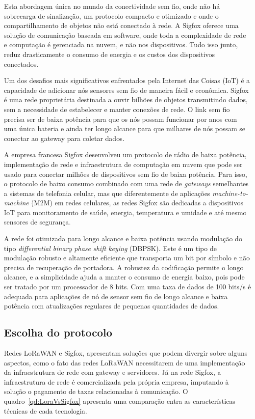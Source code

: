 Esta abordagem única no mundo da conectividade sem fio, onde não há sobrecarga de sinalização, um protocolo compacto e otimizado e onde o compartilhamento de objetos não está conectado à rede.
A Sigfox oferece uma solução de comunicação baseada em software, onde toda a complexidade de rede e computação é gerenciada na nuvem, e não nos dispositivos. Tudo isso junto, reduz drasticamente o consumo de energia e os custos dos dispositivos conectados.


Um dos desafios mais significativos enfrentados pela Internet das Coisas (IoT) é a capacidade de adicionar nós sensores sem fio de maneira fácil e econômica. Sigfox é uma rede proprietária destinada a ouvir bilhões de objetos transmitindo dados, sem a necessidade de estabelecer e manter conexões de rede. O link sem fio precisa ser de baixa potência para que os nós possam funcionar por anos com uma única bateria e ainda ter longo alcance para que milhares de nós possam se conectar ao gateway para coletar dados.

A empresa francesa Sigfox desenvolveu um protocolo de rádio de baixa potência, implementação de rede e infraestrutura de computação em nuvem que pode ser usado para conectar milhões de dispositivos sem fio de baixa potência. Para isso, o protocolo de baixo consumo combinado com uma rede de \textit{gateways} semelhantes a sistemas de telefonia celular, mas que diferentemente de aplicações \textit{machine-to-machine} (M2M) em redes celulares, as redes Sigfox são dedicadas a dispositivos IoT para monitoramento de saúde, energia, temperatura e umidade e até mesmo sensores de segurança.

A rede foi otimizada para longo alcance e baixa potência usando modulação do tipo \textit{differential binary phase shift keying} (DBPSK). Este é um tipo de modulação robusto e altamente eficiente que transporta um bit por símbolo e não precisa de recuperação de portadora. A robustez da codificação permite o longo alcance, e a simplicidade ajuda a manter o consumo de energia baixo, pois pode ser tratado por um processador de 8 bits. Com uma taxa de dados de 100 bits/s é adequada para aplicações de nó de sensor sem fio de longo alcance e baixa potência com atualizações regulares de pequenas quantidades de dados.


\subsection{Escolha do protocolo}
Redes LoRaWAN e Sigfox, apresentam soluções que podem divergir sobre alguns aspectos, como o fato das redes LoRaWAN necessitarem de uma implementação da infraestrutura de rede com gateway e servidores. Já na rede Sigfox, a infraestrutura de rede é comercializada pela própria empresa, imputando à solução o pagamento de taxas relacionadas à comunicação. O quadro~\ref{qd:LoraVsSigfox} apresenta uma comparação entra as características técnicas de cada tecnologia.

